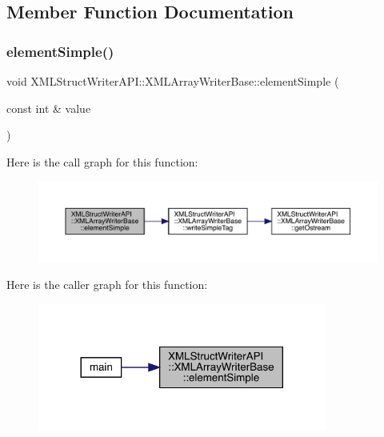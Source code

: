 \subsection{Member Function Documentation}
\mbox{\label{classXMLStructWriterAPI_1_1XMLArrayWriterBase_a4523996304d9e9468147d12602257364}} 
\subsubsection{\texorpdfstring{elementSimple()}{elementSimple()}\hspace{0.1cm}{\footnotesize\ttfamily [1/12]}}
{\footnotesize\ttfamily void X\+M\+L\+Struct\+Writer\+A\+P\+I\+::\+X\+M\+L\+Array\+Writer\+Base\+::element\+Simple (\begin{DoxyParamCaption}\item[{const int \&}]{value }\end{DoxyParamCaption})\hspace{0.3cm}{\ttfamily [inline]}}

Here is the call graph for this function\+:
\nopagebreak
\begin{figure}[H]
\begin{center}
\leavevmode
\includegraphics[width=350pt]{d5/d41/classXMLStructWriterAPI_1_1XMLArrayWriterBase_a4523996304d9e9468147d12602257364_cgraph}
\end{center}
\end{figure}
Here is the caller graph for this function\+:
\nopagebreak
\begin{figure}[H]
\begin{center}
\leavevmode
\includegraphics[width=269pt]{d5/d41/classXMLStructWriterAPI_1_1XMLArrayWriterBase_a4523996304d9e9468147d12602257364_icgraph}
\end{center}
\end{figure}
\mbox{\label{classXMLStructWriterAPI_1_1XMLArrayWriterBase_a4523996304d9e9468147d12602257364}} 
